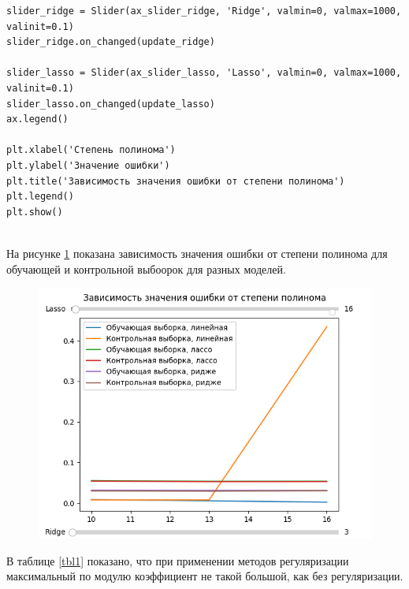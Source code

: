 \documentclass[12pt]{report}
\begin{document}
\begin{lstlisting}[label=lst:gen,caption=код, решающий поставленную задачу]
slider_ridge = Slider(ax_slider_ridge, 'Ridge', valmin=0, valmax=1000, valinit=0.1)
slider_ridge.on_changed(update_ridge)

slider_lasso = Slider(ax_slider_lasso, 'Lasso', valmin=0, valmax=1000, valinit=0.1)
slider_lasso.on_changed(update_lasso)
ax.legend()

plt.xlabel('Степень полинома')
plt.ylabel('Значение ошибки')
plt.title('Зависимость значения ошибки от степени полинома')
plt.legend()
plt.show()


\end{lstlisting}

На рисунке \ref{fig:points5} показана зависимость значения ошибки от степени полинома для обучающей и контрольной выбоорок для разных моделей.

\begin{figure}[H!]
  \centering
  \includegraphics[width = \linewidth]{f1.png}
  \caption{}
  \label{fig:points5}
\end{figure}

В таблице \ref{tbl1} показано, что при применении методов регуляризации максимальный по модулю коэффициент не такой большой, как без регуляризации.
\end{document}
